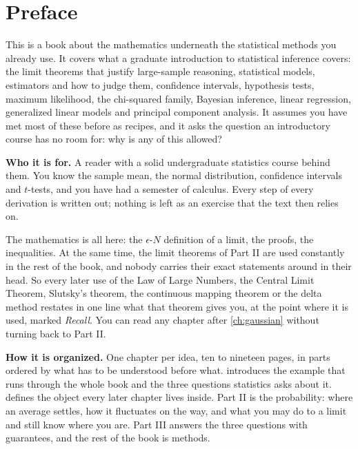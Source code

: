 \chapter{Preface}
\label{ch:preface}

This is a book about the mathematics underneath the statistical methods you already use.
It covers what a graduate introduction to statistical inference covers: the limit theorems that justify large-sample reasoning, statistical models, estimators and how to judge them, confidence intervals, hypothesis tests, maximum likelihood, the chi-squared family, Bayesian inference, linear regression, generalized linear models and principal component analysis.
It assumes you have met most of these before as recipes, and it asks the question an introductory course has no room for: why is any of this allowed?

\textbf{Who it is for.}
A reader with a solid undergraduate statistics course behind them.
You know the sample mean, the normal distribution, confidence intervals and $t$-tests, and you have had a semester of calculus.
Every step of every derivation is written out; nothing is left as an exercise that the text then relies on.

The mathematics is all here: the $\epsilon$-$N$ definition of a limit, the proofs, the inequalities.
At the same time, the limit theorems of Part II are used constantly in the rest of the book, and nobody carries their exact statements around in their head.
So every later use of the Law of Large Numbers, the Central Limit Theorem, Slutsky's theorem, the continuous mapping theorem or the delta method restates in one line what that theorem gives you, at the point where it is used, marked \textit{Recall}.
You can read any chapter after \cref{ch:gaussian} without turning back to Part II.

\textbf{How it is organized.}
One chapter per idea, ten to nineteen pages, in parts ordered by what has to be understood before what.
 introduces the example that runs through the whole book and the three questions statistics asks about it.
 defines the object every later chapter lives inside.
Part II is the probability: where an average settles, how it fluctuates on the way, and what you may do to a limit and still know where you are.
Part III answers the three questions with guarantees, and the rest of the book is methods.

